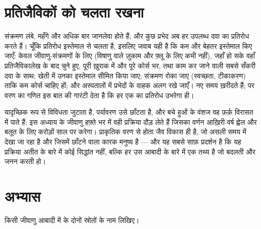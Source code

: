 \section{प्रतिजैविकों को चलता रखना}

\begin{proposition}[नतीजे और जवाब]\label{prop:g11:antibiotic-resistance:consequences}
 संक्रमण लंबे, महँगे और अधिक बार जानलेवा होते हैं; और कुछ प्रभेद
अब हर उपलब्ध दवा का प्रतिरोध करते हैं। चूँकि प्रतिरोध इस्तेमाल से चलता है,
इसलिए जवाब यही है कि  कम और बेहतर इस्तेमाल किए जाएँ: केवल
जीवाणु-संक्रमणों के लिए (विषाणु वाले ज़ुकाम और फ़्लू के लिए कभी नहीं),
जहाँ हो सके वहाँ प्रतिजैविकालेख के बाद चुने हुए, पूरी ख़ुराक में और पूरे
कोर्स भर, तथा काम कर जाने वाली सबसे सँकरी दवा के साथ; खेती में उनका
इस्तेमाल सीमित किया जाए; संक्रमण रोका जाए (स्वच्छता, टीकाकरण) ताकि कम कोर्स
चाहिए हों; और अस्पतालों में  प्रभेदों के वाहक अलग रखे जाएँ। नए
 समय ख़रीदते हैं; पर वरण का गणित इस बात की गारंटी देता है कि हर
एक का प्रतिरोध उभरेगा ही।
\end{proposition}
\admitted

\begin{remark}[हफ़्ते भर में जैव विकास]\label{rem:g11:antibiotic-resistance:evolution}
 यादृच्छिक रूप से विविधता जुटाता है, पर्यावरण उसे छाँटता है, और
बचे हुओं के वंशज वह फ़र्क़ विरासत में पाते हैं: इस अध्याय के जीवाणु हफ़्ते
भर में वही प्रक्रिया दौड़ लेते हैं जिसका वर्णन आख़िरी वर्ष ह्वेल और बलूत
के लिए करोड़ों साल पर करेगा।  प्राकृतिक वरण से होता जैव
विकास ही है, जो असली समय में देखा जा रहा है और जिसमें छाँटने वाला कारक
मनुष्य है --- और यह सबसे साफ़ प्रदर्शन है कि यह प्रक्रिया अतीत के बारे में
कोई सिद्धांत नहीं, बल्कि हर उस आबादी के बारे में एक तथ्य है जो बदलती और
जनन करती हो।
\end{remark}

\section{अभ्यास}

\begin{exercise}[$\star$]\label{exo:g11:antibiotic-resistance:1}
किसी जीवाणु आबादी में  के दोनों स्रोतों के नाम लिखिए।
\end{exercise}

